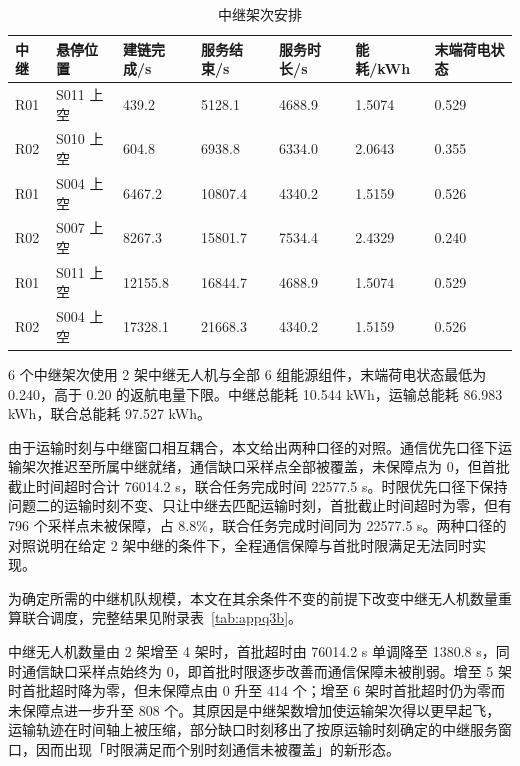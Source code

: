 \documentclass[bwprint]{gmcmthesis}
\begin{document}
\begin{table}[htbp]
\centering
\caption{中继架次安排}
\label{tab:q3missions}
\renewcommand\arraystretch{1.15}
\begin{tabular}{|Y{0.09}|W{0.20}|Y{0.135}|Y{0.135}|Y{0.135}|Y{0.125}|Y{0.155}|}
  \hline
  中继 & 悬停位置 & 建链完成/s & 服务结束/s & 服务时长/s & 能耗/kWh & 末端荷电状态 \\
  \hline
  R01 & S011 上空 & 439.2 & 5128.1 & 4688.9 & 1.5074 & 0.529 \\
  \hline
  R02 & S010 上空 & 604.8 & 6938.8 & 6334.0 & 2.0643 & 0.355 \\
  \hline
  R01 & S004 上空 & 6467.2 & 10807.4 & 4340.2 & 1.5159 & 0.526 \\
  \hline
  R02 & S007 上空 & 8267.3 & 15801.7 & 7534.4 & 2.4329 & 0.240 \\
  \hline
  R01 & S011 上空 & 12155.8 & 16844.7 & 4688.9 & 1.5074 & 0.529 \\
  \hline
  R02 & S004 上空 & 17328.1 & 21668.3 & 4340.2 & 1.5159 & 0.526 \\
  \hline
\end{tabular}
\end{table}

6 个中继架次使用 2 架中继无人机与全部 6 组能源组件，末端荷电状态最低为 0.240，高于 0.20 的返航电量下限。中继总能耗 10.544 kWh，运输总能耗 86.983 kWh，联合总能耗 97.527 kWh。

由于运输时刻与中继窗口相互耦合，本文给出两种口径的对照。通信优先口径下运输架次推迟至所属中继就绪，通信缺口采样点全部被覆盖，未保障点为 0，但首批截止时间超时合计 76014.2 s，联合任务完成时间 22577.5 s。时限优先口径下保持问题二的运输时刻不变、只让中继去匹配运输时刻，首批截止时间超时为零，但有 796 个采样点未被保障，占 8.8\%，联合任务完成时间同为 22577.5 s。两种口径的对照说明在给定 2 架中继的条件下，全程通信保障与首批时限满足无法同时实现。

为确定所需的中继机队规模，本文在其余条件不变的前提下改变中继无人机数量重算联合调度，完整结果见附录表~\ref{tab:appq3b}。



中继无人机数量由 2 架增至 4 架时，首批超时由 76014.2 s 单调降至 1380.8 s，同时通信缺口采样点始终为 0，即首批时限逐步改善而通信保障未被削弱。增至 5 架时首批超时降为零，但未保障点由 0 升至 414 个；增至 6 架时首批超时仍为零而未保障点进一步升至 808 个。其原因是中继架数增加使运输架次得以更早起飞，运输轨迹在时间轴上被压缩，部分缺口时刻移出了按原运输时刻确定的中继服务窗口，因而出现「时限满足而个别时刻通信未被覆盖」的新形态。
\end{document}
